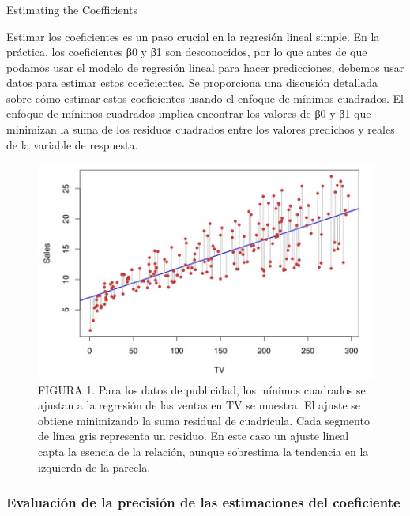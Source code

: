 \documentclass[
  letterpaper,
  DIV=11,
  numbers=noendperiod]{scrartcl}
\begin{document}
\hypertarget{section}{%
\subsubsection{}\label{section}}

Estimating the Coefficients

Estimar los coeficientes es un paso crucial en la regresión lineal
simple. En la práctica, los coeficientes β0 y β1 son desconocidos, por
lo que antes de que podamos usar el modelo de regresión lineal para
hacer predicciones, debemos usar datos para estimar estos coeficientes.
Se proporciona una discusión detallada sobre cómo estimar estos
coeficientes usando el enfoque de mínimos cuadrados. El enfoque de
mínimos cuadrados implica encontrar los valores de β0 y β1 que minimizan
la suma de los residuos cuadrados entre los valores predichos y reales
de la variable de respuesta.

\begin{figure}

{\centering \includegraphics{images/reg.jpg}

}

\caption{FIGURA 1. Para los datos de publicidad, los mínimos cuadrados
se ajustan a la regresión de las ventas en TV se muestra. El ajuste se
obtiene minimizando la suma residual de cuadrícula. Cada segmento de
línea gris representa un residuo. En este caso un ajuste lineal capta la
esencia de la relación, aunque sobrestima la tendencia en la izquierda
de la parcela.}

\end{figure}

\hypertarget{evaluaciuxf3n-de-la-precisiuxf3n-de-las-estimaciones-del-coeficiente}{%
\subsubsection{Evaluación de la precisión de las estimaciones del
coeficiente}\label{evaluaciuxf3n-de-la-precisiuxf3n-de-las-estimaciones-del-coeficiente}}
\end{document}
